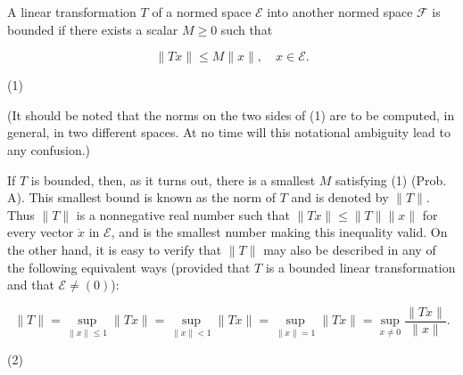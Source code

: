 A linear transformation $T$ of a normed space $\mathcal{E}$ into another normed space $\mathcal{F}$ is bounded if there exists a scalar $M \geq 0$ such that

$$\| Tx \| \leq M \| x \|, \quad x \in \mathcal{E}.$$  

(1)

(It should be noted that the norms on the two sides of (1) are to be computed, in general, in two different spaces. At no time will this notational ambiguity lead to any confusion.)

If $T$ is bounded, then, as it turns out, there is a smallest $M$ satisfying (1) (Prob. A). This smallest bound is known as the norm of $T$ and is denoted by $\| T \|$. Thus $\| T \|$ is a nonnegative real number such that $\| Tx \| \leq \| T \| \| x \|$ for every vector $\dot{x}$ in $\mathcal{E}$, and is the smallest number making this inequality valid. On the other hand, it is easy to verify that $\| T \|$ may also be described in any of the following equivalent ways (provided that $T$ is a bounded linear transformation and that $\mathcal{E} \neq (0)$):

$$\| T \| = \sup_{\| x \| \leq 1} \| Tx \| = \sup_{\| x \| < 1} \| Tx \| = \sup_{\| x \| = 1} \| Tx \| = \sup_{x \neq 0} \frac{\| Tx \|}{\| x \|}.$$  

(2)
